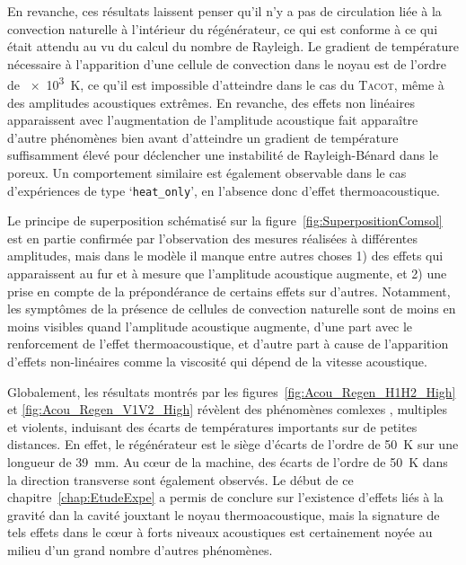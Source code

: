 En revanche, ces résultats laissent penser qu'il n'y a pas de circulation liée à la convection naturelle à l'intérieur du régénérateur, ce qui est conforme à ce qui était attendu au vu du calcul du nombre de Rayleigh. Le gradient de température nécessaire à l'apparition d'une cellule de convection dans le noyau est de l'ordre de \qty{e3}{\kelvin}, ce qu'il est impossible d'atteindre dans le cas du \textsc{Tacot}, même à des amplitudes acoustiques extrêmes. En revanche, des effets non linéaires apparaissent avec l'augmentation de l'amplitude acoustique fait apparaître d'autre phénomènes bien avant d'atteindre un gradient de température suffisamment élevé pour déclencher une instabilité de Rayleigh-Bénard dans le poreux. Un comportement similaire est également observable dans le cas d'expériences de type `\texttt{heat\_only}', en l'absence donc d'effet thermoacoustique.\smallskip

Le principe de superposition schématisé sur la figure~\ref{fig:SuperpositionComsol} est en partie confirmée par l'observation des mesures réalisées à différentes amplitudes, mais dans le modèle il manque entre autres choses 1) des effets qui apparaissent au fur et à mesure que l'amplitude acoustique augmente, et 2) une prise en compte de la prépondérance de certains effets sur d'autres. Notamment, les symptômes de la présence de cellules de convection naturelle sont de moins en moins visibles quand l'amplitude acoustique augmente, d'une part avec le renforcement de l'effet thermoacoustique, et d'autre part à cause de l'apparition d'effets non-linéaires comme la viscosité qui dépend de la vitesse acoustique.\smallskip

Globalement, les résultats montrés par les figures~\ref{fig:Acou_Regen_H1H2_High} et \ref{fig:Acou_Regen_V1V2_High} révèlent des phénomènes comlexes , multiples et violents, induisant des écarts de températures importants sur de petites distances. En effet, le régénérateur est le siège d'écarts de l'ordre de \qty{50}{\kelvin} sur une longueur de \qty{39}{\mm}. Au c\oe{}ur de la machine, des écarts de l'ordre de \qty{50}{\kelvin} dans la direction transverse sont également observés. Le début de ce chapitre~\ref{chap:EtudeExpe} a permis de conclure sur l'existence d'effets liés à la gravité dan la cavité jouxtant le noyau thermoacoustique, mais la signature de tels effets dans le c\oe{}ur à forts niveaux acoustiques est certainement noyée au milieu d'un grand nombre d'autres phénomènes.\medskip

